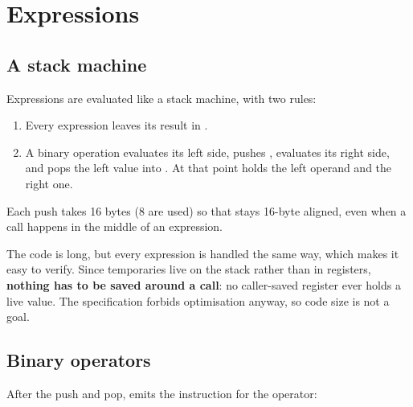 \documentclass[12pt]{article}
\begin{document}
\section{Expressions}

\subsection{A stack machine}

Expressions are evaluated like a stack machine, with two rules:

\begin{enumerate}
  \item Every expression leaves its result in .
  \item A binary operation evaluates its left side, pushes , evaluates its right side, and pops the
        left value into . At that point  holds the left operand and  the right one.
\end{enumerate}


Each push takes 16 bytes (8 are used) so that  stays 16-byte aligned, even when a call happens in
the middle of an expression.

The code is long, but every expression is handled the same way, which makes it easy to verify. Since
temporaries live on the stack rather than in registers, \textbf{nothing has to be saved around a call}:
no caller-saved register ever holds a live value. The specification forbids optimisation anyway, so code
size is not a goal.

\subsection{Binary operators}


After the push and pop,  emits the instruction for the operator:
\end{document}
